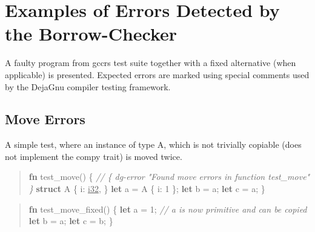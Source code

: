 \documentclass[
  11pt,
  twoside,symmetric]{report}
\newenvironment{Shaded}{}{}
\newcommand{\CommentTok}[1]{\textit{#1}}
\newcommand{\DataTypeTok}[1]{\underline{#1}}
\newcommand{\DecValTok}[1]{#1}
\newcommand{\KeywordTok}[1]{\textbf{#1}}
\newcommand{\NormalTok}[1]{#1}
\newcommand{\OperatorTok}[1]{#1}
\begin{document}
\chapter{Examples of Errors Detected by the
Borrow-Checker}\label{sec:errors}

A faulty program from gccrs test suite together with a fixed alternative
(when applicable) is presented. Expected errors are marked using special
comments used by the DejaGnu compiler testing framework.

\section{Move Errors}\label{sec:move-errors}

A simple test, where an instance of type A, which is not trivially
copiable (does not implement the compy trait) is moved twice.

\begin{quote}
\begin{Shaded}
\begin{Highlighting}[]
\KeywordTok{fn}\NormalTok{ test\_move() }\OperatorTok{\{}
    \CommentTok{// \{ dg{-}error "Found move errors in function test\_move" \}}
    \KeywordTok{struct}\NormalTok{ A }\OperatorTok{\{}
\NormalTok{        i}\OperatorTok{:} \DataTypeTok{i32}\OperatorTok{,}
    \OperatorTok{\}}
    \KeywordTok{let}\NormalTok{ a }\OperatorTok{=}\NormalTok{ A }\OperatorTok{\{}\NormalTok{ i}\OperatorTok{:} \DecValTok{1} \OperatorTok{\};}
    \KeywordTok{let}\NormalTok{ b }\OperatorTok{=}\NormalTok{ a}\OperatorTok{;}
    \KeywordTok{let}\NormalTok{ c }\OperatorTok{=}\NormalTok{ a}\OperatorTok{;}
\OperatorTok{\}}
\end{Highlighting}
\end{Shaded}
\end{quote}

\begin{quote}
\begin{Shaded}
\begin{Highlighting}[]
\KeywordTok{fn}\NormalTok{ test\_move\_fixed() }\OperatorTok{\{}
    \KeywordTok{let}\NormalTok{ a }\OperatorTok{=} \DecValTok{1}\OperatorTok{;} \CommentTok{// a is now primitive and can be copied}
    \KeywordTok{let}\NormalTok{ b }\OperatorTok{=}\NormalTok{ a}\OperatorTok{;}
    \KeywordTok{let}\NormalTok{ c }\OperatorTok{=}\NormalTok{ b}\OperatorTok{;}
\OperatorTok{\}}
\end{Highlighting}
\end{Shaded}
\end{quote}
\end{document}
